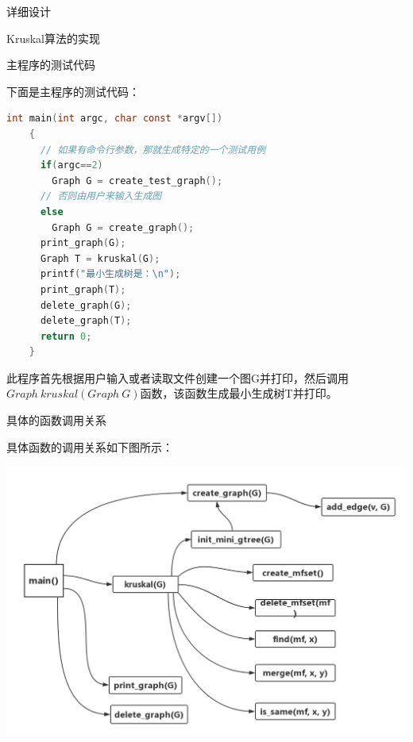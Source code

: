 \documentclass[UTF8]{ctexart}
\begin{document}
\begin{section}{详细设计}
\begin{subsection}{Kruskal算法的实现}
\end{subsection}


\begin{subsection}{主程序的测试代码}
\par{下面是主程序的测试代码：\\}

\begin{mdframed}[everyline=true]
\begin{lstlisting}[language=c]
    int main(int argc, char const *argv[])
    {
      // 如果有命令行参数，那就生成特定的一个测试用例
      if(argc==2)
        Graph G = create_test_graph();
      // 否则由用户来输入生成图
      else
        Graph G = create_graph();
      print_graph(G);
      Graph T = kruskal(G);
      printf("最小生成树是：\n");
      print_graph(T);
      delete_graph(G);
      delete_graph(T);
      return 0;
    }
\end{lstlisting}
\end{mdframed}

\par{此程序首先根据用户输入或者读取文件创建一个图G并打印，然后调用$Graph\ kruskal(Graph\ G)$函数，该函数生成最小生成树T并打印。}

\end{subsection}

\begin{subsection}{具体的函数调用关系}

\par{具体函数的调用关系如下图所示：}

\includegraphics[height=9cm]{"fig3.png"}

\end{subsection}

\end{section}
\end{document}
